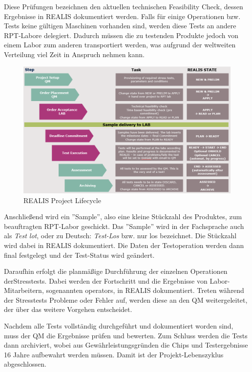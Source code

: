 Diese Prüfungen bezeichnen den aktuellen technischen Feasibility Check, dessen Ergebnisse in \gls{REALIS} dokumentiert werden.
Falls für einige Operationen bzw. Tests keine gültigen Maschinen vorhanden sind, werden diese Tests an andere \gls{RPT}-Labore delegiert. Dadurch müssen die zu testenden Produkte jedoch von einem Labor zum anderen transportiert werden, was aufgrund der weltweiten Verteilung viel Zeit in Anspruch nehmen kann.

\begin{figure}[!h]
    \centering
    \includegraphics[width=1\textwidth]{bilder/realis-project-lifecycle.png}
    \caption{REALIS Project Lifecycle \cite{REALISWikiIntern}}
    \label{fig:realis-project-lifecycle}
\end{figure}

Anschließend wird ein ''Sample'', also eine kleine Stückzahl des Produktes, zum beauftragten \gls{RPT}-Labor geschickt. Das ''Sample'' wird in der Fachsprache auch als \textit{Test lot}, oder zu Deutsch: \textit{Test-Los} bzw. nur \gls{los} bezeichnet. Die Stückzahl wird dabei in \gls{REALIS} dokumentiert. Die  Daten der Testoperation werden dann final festgelegt und der Test-Status wird geändert.

Daraufhin erfolgt die planmäßige Durchführung der einzelnen Operationen der\linebreak Stresstests. Dabei werden der Fortschritt und die Ergebnisse von Labor-Mitarbeitern, sogenannten \glspl{operator}, in \gls{REALIS} dokumentiert. Treten während der Stresstests Probleme oder Fehler auf, werden diese an den \gls{QM} weitergeleitet, der über das weitere Vorgehen entscheidet.

Nachdem alle Tests vollständig durchgeführt und dokumentiert worden sind, muss der \gls{QM} die Ergebnisse prüfen und bewerten. Zum Schluss werden die Tests dann archiviert, wobei aus Gewährleistungsgründen die Chips und Testergebnisse 16 Jahre aufbewahrt werden müssen. Damit ist der Projekt-Lebenszyklus abgeschlossen.

